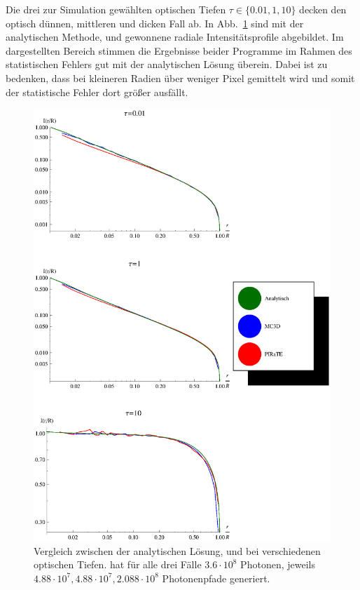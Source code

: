 	Die drei zur Simulation gewählten optischen Tiefen $\tau\in\{0.01,1,10\}$ decken den optisch dünnen, mittleren und dicken Fall ab.	In Abb.~\ref{fig:methodcomparisongraphics} sind mit der analytischen Methode, \mctd und \pirate gewonnene radiale Intensitätsprofile abgebildet.
	Im dargestellten Bereich stimmen die Ergebnisse beider Programme im Rahmen des statistischen Fehlers gut mit der analytischen Lösung überein. Dabei ist zu bedenken, dass bei kleineren Radien über weniger Pixel gemittelt wird und somit der statistische Fehler dort größer ausfällt.
		\begin{figure}
			\centering
			\includegraphics[height=1.0\textheight]{methodcomparisongraphics.eps}
			\caption{Vergleich zwischen der analytischen Lösung, \mctd und \pirate bei verschiedenen optischen Tiefen. \mctd hat für alle drei Fälle $3.6\cdot10^8$ Photonen, \pirate jeweils $4.88\cdot10^7,4.88\cdot10^7,2.088\cdot10^8$ Photonenpfade generiert.}
			\label{fig:methodcomparisongraphics}
		\end{figure}
	
